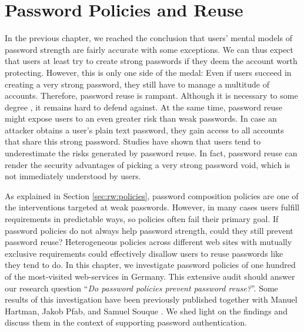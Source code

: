 \chapter[Password Policies and Reuse]{Password Policies and Reuse}\label{chap:policies_reuse}
In the previous chapter, we reached the conclusion that users' mental models of password strength are fairly accurate with some exceptions. We can thus expect that users at least try to create strong passwords if they deem the account worth protecting. 
However, this is only one side of the medal: Even if users succeed in creating a very strong password, they still have to manage a multitude of accounts. Therefore, password reuse is rampant. Although it is necessary to some degree \cite{Florencio2014PasswordPortfoliosFiniteUser, ZhangKennedy2016RevisitingPasswordRules}, it remains hard to defend against.  At the same time, password reuse might expose users to an even greater risk than weak passwords.  In case an attacker obtains a user's plain text password, they gain access to all accounts that share this strong password. Studies have shown that users tend to underestimate the risks generated by password reuse. In fact, password reuse can render the security advantages of picking a very strong password void, which is not immediately understood by users.

As explained in Section \ref{sec:rw:policies}, password composition policies are one of the interventions targeted at weak passwords. However, in many cases users fulfill requirements in predictable ways, so policies often fail their primary goal. If password policies do not always help password strength, could they still prevent password reuse? Heterogeneous policies across different web sites with mutually exclusive requirements could effectively disallow users to reuse passwords like they tend to do. In this chapter, we investigate password policies of one hundred of the most-visited web-services in Germany. This extensive audit should answer our research question ``\textit{Do password policies prevent password reuse?}''. Some results of this investigation have been previously published together with Manuel Hartman, Jakob Pfab, and Samuel Souque \cite{Seitz2017PoliciesReuse}. We shed light on the findings and discuss them in the context of supporting password authentication. 

